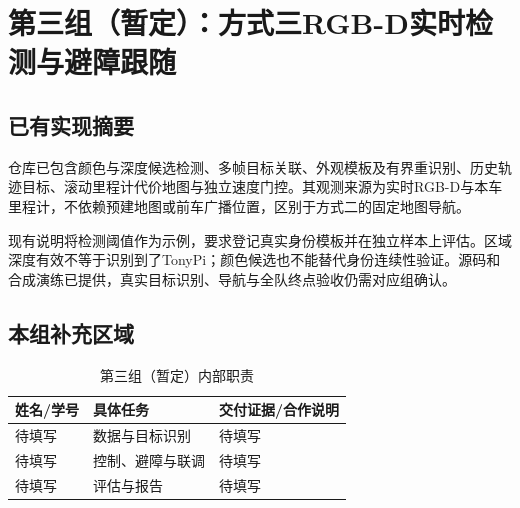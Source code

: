 \section{第三组（暂定）：方式三RGB-D实时检测与避障跟随}
\subsection{已有实现摘要}
仓库已包含颜色与深度候选检测、多帧目标关联、外观模板及有界重识别、历史轨迹目标、滚动里程计代价地图与独立速度门控\cite{follow3}。其观测来源为实时RGB-D与本车里程计，不依赖预建地图或前车广播位置，区别于方式二的固定地图导航。

现有说明将检测阈值作为示例，要求登记真实身份模板并在独立样本上评估。区域深度有效不等于识别到了TonyPi；颜色候选也不能替代身份连续性验证。源码和合成演练已提供，真实目标识别、导航与全队终点验收仍需对应组确认。
\subsection{本组补充区域}
\begin{table}[htbp]\centering\small
\begin{tabularx}{\linewidth}{p{28mm}YY}\toprule
姓名/学号 & 具体任务 & 交付证据/合作说明\\\midrule
待填写 & 数据与目标识别 & 待填写\\
待填写 & 控制、避障与联调 & 待填写\\
待填写 & 评估与报告 & 待填写\\\bottomrule
\end{tabularx}\caption{第三组（暂定）内部职责}\end{table}
